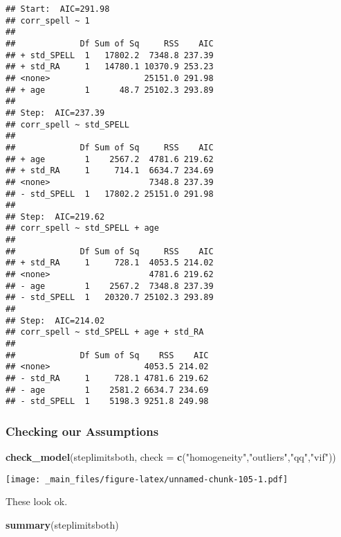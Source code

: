 \documentclass[
]{book}
\newenvironment{Shaded}{\begin{snugshade}}{\end{snugshade}}
\newcommand{\AttributeTok}[1]{\textcolor[rgb]{0.13,0.29,0.53}{#1}}
\newcommand{\FunctionTok}[1]{\textcolor[rgb]{0.13,0.29,0.53}{\textbf{#1}}}
\newcommand{\NormalTok}[1]{#1}
\newcommand{\StringTok}[1]{\textcolor[rgb]{0.31,0.60,0.02}{#1}}
\begin{document}
\begin{verbatim}
## Start:  AIC=291.98
## corr_spell ~ 1
## 
##             Df Sum of Sq     RSS    AIC
## + std_SPELL  1   17802.2  7348.8 237.39
## + std_RA     1   14780.1 10370.9 253.23
## <none>                   25151.0 291.98
## + age        1      48.7 25102.3 293.89
## 
## Step:  AIC=237.39
## corr_spell ~ std_SPELL
## 
##             Df Sum of Sq     RSS    AIC
## + age        1    2567.2  4781.6 219.62
## + std_RA     1     714.1  6634.7 234.69
## <none>                    7348.8 237.39
## - std_SPELL  1   17802.2 25151.0 291.98
## 
## Step:  AIC=219.62
## corr_spell ~ std_SPELL + age
## 
##             Df Sum of Sq     RSS    AIC
## + std_RA     1     728.1  4053.5 214.02
## <none>                    4781.6 219.62
## - age        1    2567.2  7348.8 237.39
## - std_SPELL  1   20320.7 25102.3 293.89
## 
## Step:  AIC=214.02
## corr_spell ~ std_SPELL + age + std_RA
## 
##             Df Sum of Sq    RSS    AIC
## <none>                   4053.5 214.02
## - std_RA     1     728.1 4781.6 219.62
## - age        1    2581.2 6634.7 234.69
## - std_SPELL  1    5198.3 9251.8 249.98
\end{verbatim}

\hypertarget{checking-our-assumptions-4}{%
\subsubsection*{Checking our Assumptions}\label{checking-our-assumptions-4}}

\begin{Shaded}
\begin{Highlighting}[]
\FunctionTok{check\_model}\NormalTok{(steplimitsboth, }\AttributeTok{check =} \FunctionTok{c}\NormalTok{(}\StringTok{"homogeneity"}\NormalTok{,}\StringTok{"outliers"}\NormalTok{,}\StringTok{"qq"}\NormalTok{,}\StringTok{"vif"}\NormalTok{))}
\end{Highlighting}
\end{Shaded}

\texttt{[image: \_main\_files/figure-latex/unnamed-chunk-105-1.pdf]}

These look ok.

\begin{Shaded}
\begin{Highlighting}[]
\FunctionTok{summary}\NormalTok{(steplimitsboth)}
\end{Highlighting}
\end{Shaded}
\end{document}
